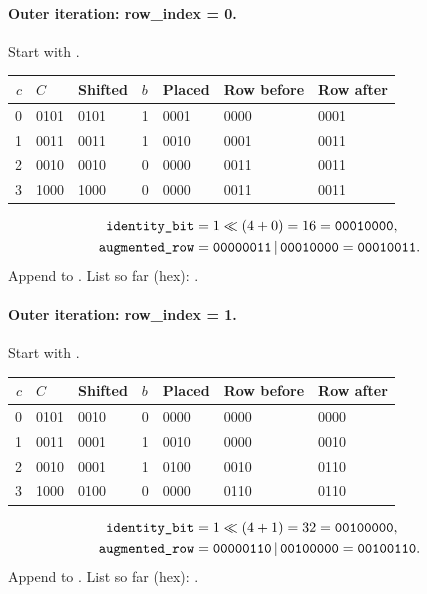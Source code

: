 \paragraph{Outer iteration: row\_index = 0.}
Start with .
\begin{center}\small\begin{tabular}{rllllll}\toprule
$c$ & $C$ & Shifted & $b$ & Placed & Row before & Row after\\\midrule
0 & 0101 & 0101 & 1 & 0001 & 0000 & 0001\\
1 & 0011 & 0011 & 1 & 0010 & 0001 & 0011\\
2 & 0010 & 0010 & 0 & 0000 & 0011 & 0011\\
3 & 1000 & 1000 & 0 & 0000 & 0011 & 0011\\
\bottomrule\end{tabular}\end{center}
\[\begin{aligned}
\texttt{identity\_bit}&=1\ll(4+0)=16=\texttt{00010000},\\
\texttt{augmented\_row}&=\texttt{00000011}\,|\,\texttt{00010000}=\texttt{00010011}.\end{aligned}\]
Append to . List so far (hex): .
\paragraph{Outer iteration: row\_index = 1.}
Start with .
\begin{center}\small\begin{tabular}{rllllll}\toprule
$c$ & $C$ & Shifted & $b$ & Placed & Row before & Row after\\\midrule
0 & 0101 & 0010 & 0 & 0000 & 0000 & 0000\\
1 & 0011 & 0001 & 1 & 0010 & 0000 & 0010\\
2 & 0010 & 0001 & 1 & 0100 & 0010 & 0110\\
3 & 1000 & 0100 & 0 & 0000 & 0110 & 0110\\
\bottomrule\end{tabular}\end{center}
\[\begin{aligned}
\texttt{identity\_bit}&=1\ll(4+1)=32=\texttt{00100000},\\
\texttt{augmented\_row}&=\texttt{00000110}\,|\,\texttt{00100000}=\texttt{00100110}.\end{aligned}\]
Append to . List so far (hex): .
